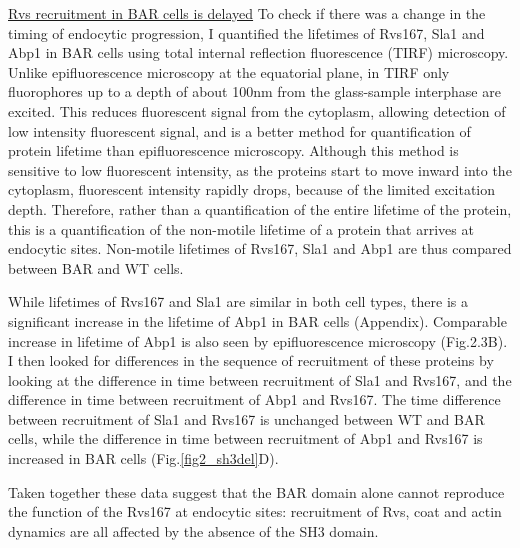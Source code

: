 	\vspace{5mm}
		\underline{Rvs recruitment in BAR cells is delayed}
To check if there was a change in the timing of endocytic progression, I quantified the lifetimes of Rvs167, Sla1 and Abp1 in BAR cells using total internal reflection fluorescence (TIRF) microscopy. Unlike epifluorescence microscopy at the equatorial plane, in TIRF only fluorophores up to a depth of about 100nm from the glass-sample interphase are excited. This reduces fluorescent signal from the cytoplasm, allowing detection of low intensity fluorescent signal, and is a better method for quantification of protein lifetime than epifluorescence microscopy. Although this method is sensitive to low fluorescent intensity, as the proteins start to move inward into the cytoplasm, fluorescent intensity rapidly drops, because of the limited excitation depth. Therefore, rather than a quantification of the entire lifetime of the protein, this is a quantification of the non-motile lifetime of a protein that arrives at endocytic sites. Non-motile lifetimes of Rvs167, Sla1 and Abp1 are thus compared between BAR and WT cells. 

While lifetimes of Rvs167 and Sla1 are similar in both cell types, there is a significant increase in the lifetime of Abp1 in BAR cells (Appendix). Comparable increase in lifetime of Abp1 is also seen by epifluorescence microscopy (Fig.2.3B). I then looked for differences in the sequence of recruitment of these proteins by looking at the difference in time between recruitment of Sla1 and Rvs167, and the difference in time between recruitment of Abp1 and Rvs167. The time difference between recruitment of Sla1 and Rvs167 is unchanged between WT and BAR cells, while the difference in time between recruitment of Abp1 and Rvs167 is increased in BAR cells  (Fig.\ref{fig2_sh3del}D).

	\vspace{5mm}
Taken together these data suggest that the BAR domain alone cannot reproduce the function of the Rvs167 at endocytic sites: recruitment of Rvs, coat and actin dynamics are all affected by the absence of the SH3 domain. 


